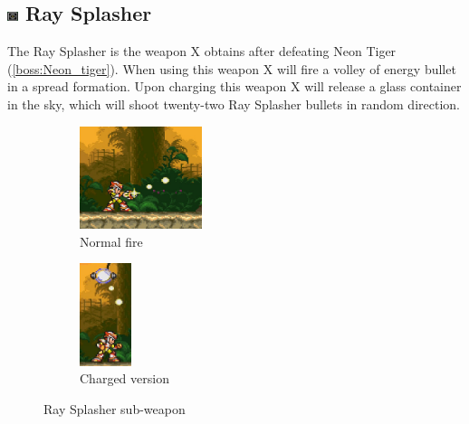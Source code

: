 \subsection{\includegraphics[width=12px, height=10px]{figures/X3/weapons/R_splasher.jpg} Ray Splasher}\label{Ray_Splasher}
The Ray Splasher is the weapon X obtains after defeating Neon Tiger (\ref{boss:Neon_tiger}). When using this weapon X will fire a volley of energy bullet in a spread formation. Upon charging this weapon X will release a glass container in the sky, which will shoot twenty-two Ray Splasher bullets in random direction.
\begin{figure}[htp]
	\centering
	\begin{subfigure}{.3\linewidth}
		\centering
		\includegraphics[height=3cm]{figures/X3/weapons/R_splasher.png}
		\caption{Normal fire}	
	\end{subfigure}
	\begin{subfigure}{.3\linewidth}
		\centering
		\includegraphics[height=3cm]{figures/X3/weapons/R_splasher_C.png}
		\caption{Charged version}	
	\end{subfigure}
	\caption{Ray Splasher sub-weapon}
\end{figure}
